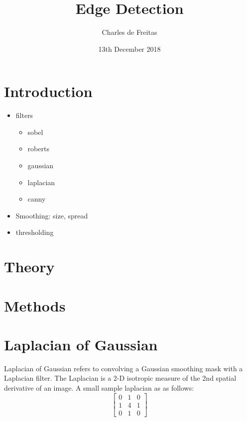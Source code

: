 \documentclass{Resources/UoBLab1}
\begin{document}

\title{Edge Detection}
\author{Charles de Freitas}
\date{13th December 2018}

\maketitle

\begin{abstract}

\end{abstract}


\section{Introduction}
\begin{itemize}
	\item filters
	      \begin{itemize}
	      	\item sobel
	      	\item roberts
	      	\item gaussian
	      	\item laplacian
	      	\item canny
	      \end{itemize}
	\item Smoothing: size, spread
	\item thresholding
\end{itemize}

\section{Theory}
\lipsum[4]

\section{Methods}
\section{Laplacian of Gaussian}
Laplacian of Gaussian refers to convolving a Gaussian smoothing mask with a Laplacian filter.
The Laplacian is a 2-D isotropic measure of the 2nd spatial derivative of an image.\cite{Laplacian}
A small sample laplacian as as follows:
\[
\begin{bmatrix}
    0 & 1 & 0 \\
    1 & 4 & 1 \\
    0 & 1 & 0
\end{bmatrix}
\]
\end{document}
